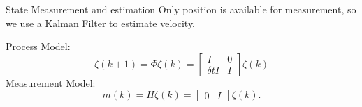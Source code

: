 \begin{frame}{State Measurement and estimation}
Only position is available for measurement, so we use a Kalman Filter to estimate velocity.

\vspace{1cm}
Process Model:
\begin{equation} \label{eq:sys_KF}
\zeta(k+1)=\Phi \zeta(k) = \begin{bmatrix}
I & 0 \\
\delta tI & I
\end{bmatrix} \zeta(k)
\end{equation} %
Measurement Model:
\begin{equation}
m(k)=H \zeta(k) =  \begin{bmatrix}
0 & I
\end{bmatrix}\zeta(k).
\end{equation}
\end{frame}


